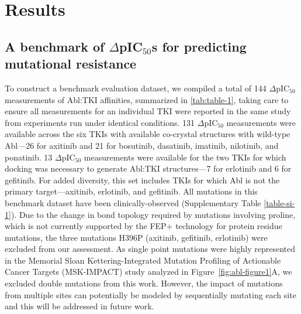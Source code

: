 \documentclass[phd,tocprelim]{cornell}
\renewcommand{\TABLE}[1]{\autoref{tab:#1}}
\begin{document}
\section{Results}
\subsection{A benchmark of $\Delta$pIC$_{50}$s for predicting mutational resistance} 
To construct a benchmark evaluation dataset, we compiled a total of 144  $\Delta$pIC$_{50}$ measurements of Abl:TKI affinities, summarized in \TABLE{table-1}, taking care to ensure all measurements for an individual TKI were reported in the same study from experiments run under identical conditions.
131 $\Delta$pIC$_{50}$ measurements were available across the six TKIs with available co-crystal structures with wild-type Abl---26 for axitinib and 21 for bosutinib, dasatinib, imatinib, nilotinib, and ponatinib.
13 $\Delta$pIC$_{50}$ measurements were available for the two TKIs for which docking was necessary to generate Abl:TKI structures---7 for erlotinib and 6 for gefitinib. 
For added diversity, this set includes TKIs for which Abl is not the primary target---axitinib, erlotinib, and gefitinib.
All mutations in this benchmark dataset have been clinically-observed (Supplementary Table \ref{table-si-1}). Due to the change in bond topology required by mutations involving proline, which is not currently supported by the FEP+ technology for protein residue mutations, the three mutations H396P (axitinib, gefitinib, erlotinib) were excluded from our assessment. As single point mutations were highly represented in the Memorial Sloan
Kettering-Integrated Mutation Profiling of Actionable Cancer Targets (MSK-IMPACT) study analyzed in Figure~\ref{fig:abl-figure1}A, we excluded double mutations from this work. However, the impact of mutations from multiple sites can potentially be modeled by sequentially mutating each site and this will be addressed in future work.
\end{document}
